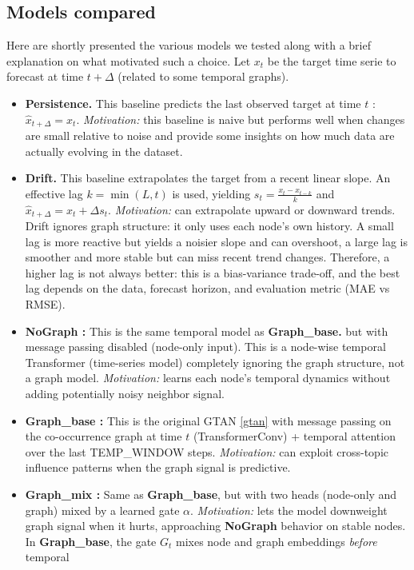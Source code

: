 \documentclass[pdflatex,sn-basic]{sn-jnl}
\begin{document}
\subsection{Models compared}
\label{modelvariants}
Here are shortly presented the various models we tested along with a brief explanation on what motivated such a choice. Let $x_t$ be the target time serie to forecast at time $t+\Delta$ (related to some temporal graphs).
\begin{itemize}
  \item \textbf{Persistence.} This baseline predicts the last observed target at time $t$ : $\hat{x}_{t+\Delta}=x_t$. \emph{Motivation:} this baseline is naive but performs well when changes are small relative to noise and provide some insights on how much data are actually evolving in the dataset.
  \item \textbf{Drift.} This baseline extrapolates the target from a recent linear slope. An effective lag
  $k=\min(L,t)$ is used, yielding
  $s_t = \frac{x_t - x_{t-k}}{k}$ and
  $\hat{x}_{t+\Delta} = x_t + \Delta s_t$.
  \emph{Motivation:} can extrapolate upward or downward trends. Drift ignores graph structure: it only uses each node's own history. A small lag is more reactive but yields a noisier slope and can overshoot,
  a large lag is smoother and more stable but can miss recent trend changes.
  Therefore, a higher lag is not always better: this is a bias-variance trade-off, and the best lag
  depends on the data, forecast horizon, and evaluation metric (MAE vs RMSE).
  \item \textbf{NoGraph :} This is the same temporal model as \textbf{Graph\_base.} but with message passing disabled (node-only
  input). This is a node-wise temporal Transformer (time-series model) completely ignoring the graph structure, not a graph model.
  \emph{Motivation:} learns each node’s temporal dynamics without adding potentially noisy
  neighbor signal.
  \item \textbf{Graph\_base :} This is the original GTAN \ref{gtan} with message passing on the co-occurrence graph at time $t$
  (TransformerConv) + temporal attention over the last TEMP\_WINDOW steps. \emph{Motivation:} can exploit cross-topic influence patterns when the graph signal is predictive.
  \item \textbf{Graph\_mix :} Same as \textbf{Graph\_base}, but with two heads (node-only and graph) mixed by a
  learned gate $\alpha$. \emph{Motivation:} lets the model downweight graph signal when it hurts,
  approaching \textbf{NoGraph} behavior on stable nodes. In \textbf{Graph\_base}, the gate $G_t$ mixes node and graph embeddings \emph{before} temporal

\end{itemize}
\end{document}
